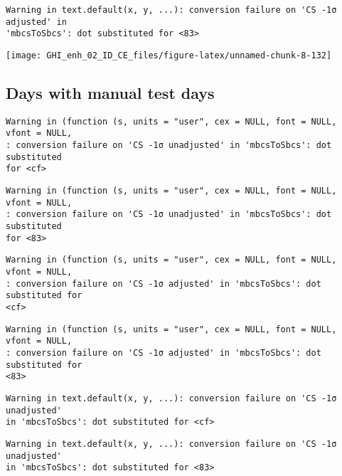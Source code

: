 \documentclass[
  10pt,
  a4paper,oneside]{article}
\begin{document}
\begin{verbatim}
Warning in text.default(x, y, ...): conversion failure on 'CS -1σ adjusted' in
'mbcsToSbcs': dot substituted for <83>
\end{verbatim}

\begin{center}\texttt{[image: GHI\_enh\_02\_ID\_CE\_files/figure-latex/unnamed-chunk-8-132]} \end{center}

\FloatBarrier

\hypertarget{days-with-manual-test-days}{%
\subsection{Days with manual test days}\label{days-with-manual-test-days}}

\begin{verbatim}
Warning in (function (s, units = "user", cex = NULL, font = NULL, vfont = NULL,
: conversion failure on 'CS -1σ unadjusted' in 'mbcsToSbcs': dot substituted
for <cf>
\end{verbatim}

\begin{verbatim}
Warning in (function (s, units = "user", cex = NULL, font = NULL, vfont = NULL,
: conversion failure on 'CS -1σ unadjusted' in 'mbcsToSbcs': dot substituted
for <83>
\end{verbatim}

\begin{verbatim}
Warning in (function (s, units = "user", cex = NULL, font = NULL, vfont = NULL,
: conversion failure on 'CS -1σ adjusted' in 'mbcsToSbcs': dot substituted for
<cf>
\end{verbatim}

\begin{verbatim}
Warning in (function (s, units = "user", cex = NULL, font = NULL, vfont = NULL,
: conversion failure on 'CS -1σ adjusted' in 'mbcsToSbcs': dot substituted for
<83>
\end{verbatim}

\begin{verbatim}
Warning in text.default(x, y, ...): conversion failure on 'CS -1σ unadjusted'
in 'mbcsToSbcs': dot substituted for <cf>
\end{verbatim}

\begin{verbatim}
Warning in text.default(x, y, ...): conversion failure on 'CS -1σ unadjusted'
in 'mbcsToSbcs': dot substituted for <83>
\end{verbatim}
\end{document}
